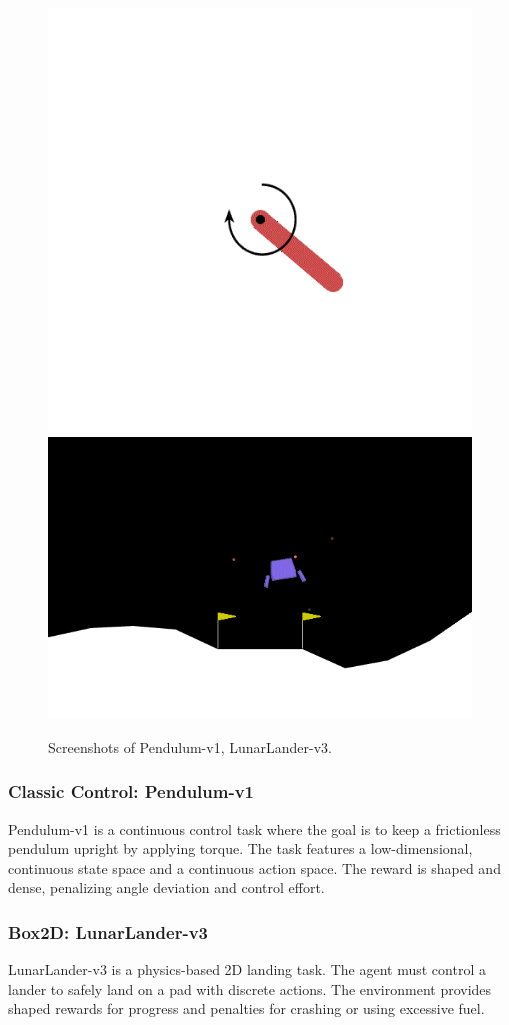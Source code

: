 \documentclass[10pt,twocolumn,letterpaper]{article}
\begin{document}
\vspace{-0.5cm}
\begin{figure}[htbp]
  \centering
  \includegraphics[width=0.45\linewidth]{assets/pendulum.png}
  \hfill
  \includegraphics[width=0.45\linewidth]{assets/lunar_lander.png}
  \caption{Screenshots of Pendulum-v1, LunarLander-v3.}
  \label{fig:env_images}
\end{figure}

\subsubsection{Classic Control: Pendulum-v1}
Pendulum-v1 is a continuous control task where the goal is to keep a frictionless pendulum upright by applying torque. The task features a low-dimensional, continuous state space and a continuous action space. The reward is shaped and dense, penalizing angle deviation and control effort.

\subsubsection{Box2D: LunarLander-v3}
LunarLander-v3 is a physics-based 2D landing task. The agent must control a lander to safely land on a pad with discrete actions. The environment provides shaped rewards for progress and penalties for crashing or using excessive fuel.
\end{document}
